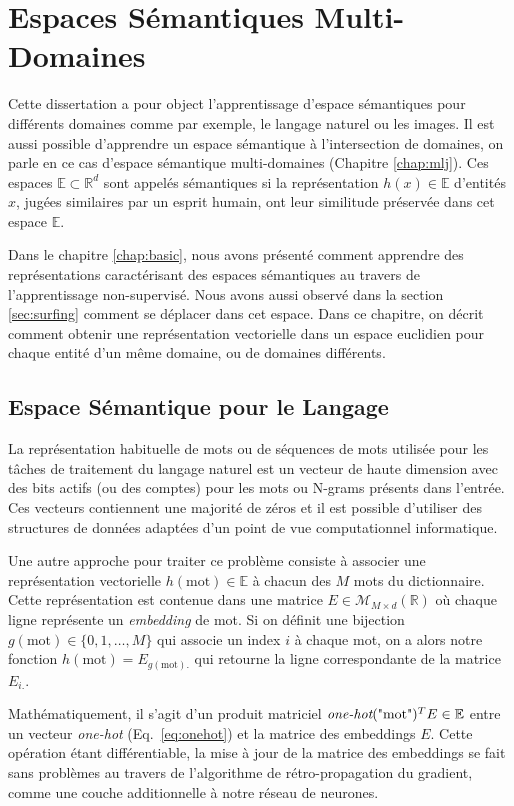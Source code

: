 \chapter{Espaces Sémantiques Multi-Domaines}

Cette dissertation a pour object l'apprentissage d'espace sémantiques pour
différents domaines comme par exemple, le langage naturel ou les images. Il est
aussi possible d'apprendre un espace sémantique à l'intersection de domaines,
on parle en ce cas d'espace sémantique multi-domaines (Chapitre \ref{chap:mlj}). Ces
espaces $\mathbb{E}\subset \mathbb{R}^{d}$ sont appelés sémantiques si la représentation
$h(x)\in \mathbb{E}$ d'entités $x$, jugées similaires par un esprit humain, ont leur
similitude préservée dans cet espace $\mathbb{E}$.

Dans le chapitre \ref{chap:basic}, nous avons présenté comment apprendre des
représentations caractérisant des espaces sémantiques au travers de
l'apprentissage non-supervisé. Nous avons aussi observé dans la section
\ref{sec:surfing} comment se déplacer dans cet espace. Dans ce chapitre, on
décrit comment obtenir une représentation vectorielle dans un espace euclidien
pour chaque entité d'un même domaine, ou de domaines différents.
 
  
\section{Espace Sémantique pour le Langage}

La représentation habituelle de mots ou de séquences de mots utilisée pour les
tâches de traitement du langage naturel est un vecteur de haute dimension avec
des bits actifs (ou des comptes) pour les mots ou N-grams présents dans
l'entrée. Ces vecteurs contiennent une majorité de zéros et il est possible
d'utiliser des structures de données adaptées d'un point de
vue computationnel informatique.

Une autre approche pour traiter ce problème consiste à associer une
représentation vectorielle $h(\textrm{mot})\in\mathbb{E}$ à chacun des $M$ mots
du dictionnaire. Cette représentation est contenue dans une matrice
$E\in\mathcal{M}_{M \times d}(\mathbb{R})$ où chaque ligne représente un {\it
embedding} de mot. Si on définit une bijection $g(\textrm{mot}) \in \lbrace
0,1,\dots, M \rbrace$ qui associe un index $i$ à chaque mot, on a alors notre
fonction $h(\textrm{mot})=E_{g(\textrm{mot}).}$ qui retourne la ligne
correspondante de la matrice $E_{i.}$.

Mathématiquement, il s'agit d'un produit matriciel
$\textrm{\it one-hot}(\textrm{"mot"})^{T}E\in\mathbb{E}$ entre un vecteur {\it one-hot}
(Eq.~\ref{eq:onehot}) et la matrice des embeddings $E$. Cette opération étant
différentiable, la mise à jour de la matrice des embeddings se fait sans
problèmes au travers de l'algorithme de rétro-propagation du gradient, comme
une couche additionnelle à notre réseau de neurones.

